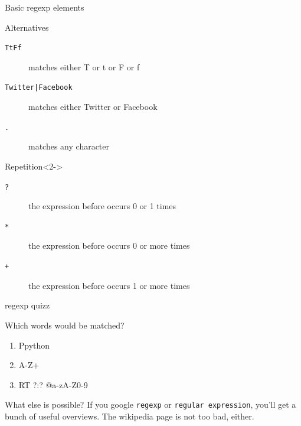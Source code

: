 \documentclass{beamer}
\begin{document}
\begin{frame}{Basic regexp elements}
\begin{block}{Alternatives}
\begin{description}
\item[{\tt{\lbrack TtFf\rbrack}}] matches either T or t or F or f
\item[{\tt{Twitter|Facebook}}] matches either Twitter or Facebook
\item[{\tt{.}}] matches any character
\end{description}
\end{block}
\begin{block}{Repetition}<2->
\begin{description}
\item[{\tt{?}}] the expression before occurs 0 or 1 times
\item[{\tt{*}}] the expression before occurs 0 or more times
\item[{\tt{+}}] the expression before occurs 1 or more times
\end{description}
\end{block}
\end{frame}

\begin{frame}{regexp quizz}
\begin{block}{Which words would be matched?}
\tt
\begin{enumerate}
\item<1-> \lbrack Pp\rbrack ython
\item<2-> \lbrack A-Z\rbrack +
\item<3-> RT ?:? @\lbrack a-zA-Z0-9\rbrack *
\end{enumerate}
\end{block}
\end{frame}

\begin{frame}{What else is possible?}
If you google {\tt{regexp}} or {\tt{regular expression}}, you'll get a bunch of useful overviews. The wikipedia page is not too bad, either. 
\end{frame}
\end{document}
